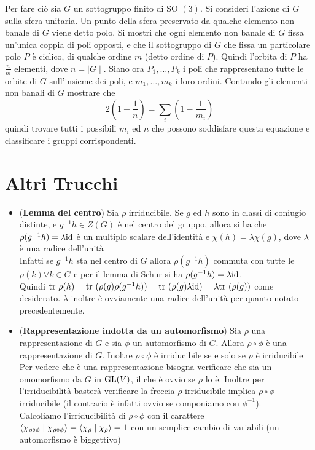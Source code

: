 \documentclass[a4paper,NoNotes,GeneralMath]{stdmdoc}
\newcommand{\SO}{\text{SO }}
\begin{document}
	Per fare ciò sia $G$ un sottogruppo finito di $\SO(3)$. Si consideri l'azione di $G$ sulla sfera unitaria. Un punto della sfera preservato da qualche elemento non banale di $G$ viene detto polo. Si mostri che ogni elemento non banale di $G$ fissa un'unica coppia di poli opposti, e che il sottogruppo di $G$ che fissa un particolare polo $P$ è ciclico, di qualche ordine $m$ (detto ordine di $P$). Quindi l'orbita di $P$ ha $\frac{n}{m}$ elementi, dove $n = \mid G \mid$. Siano ora $P_1, \ldots, P_k$ i poli che rappresentano tutte le orbite di $G$ sull'insieme dei poli, e $m_1, \ldots, m_k$ i loro ordini. Contando gli elementi non banali di $G$ mostrare che $$ 2 \left( 1 - \frac{1}{n} \right) = \sum_i \left( 1 - \frac{1}{m_i} \right) $$ quindi trovare tutti i possibili $m_i$ ed $n$ che possono soddisfare questa equazione e classificare i gruppi corrispondenti.

	\section{Altri Trucchi}
	\begin{itemize}
		\item ({\bf Lemma del centro}) Sia $\rho$ irriducibile. Se $g$ ed $h$ sono in classi di coniugio distinte, e $g^{-1}h \in Z(G)$ è nel centro del gruppo, allora si ha che $\rho(g^{-1}h) = \lambda \mbox{id}$ è un multiplo scalare dell'identità e $\chi(h) = \lambda \chi(g)$, dove $\lambda$ è una radice dell'unità \\
		Infatti se $g^{-1}h$ sta nel centro di $G$ allora $\rho(g^{-1}h)$ commuta con tutte le $\rho(k) \forall k \in G$ e per il lemma di Schur si ha $\rho(g^{-1}h) = \lambda \mbox{id}$. \\
		Quindi $\mbox{tr } \rho(h) = \mbox{tr } ( \rho(g) \rho(g^{-1}h) ) = \mbox{tr } ( \rho(g) \lambda \mbox{id}) = \lambda \mbox{tr }(\rho(g))$ come desiderato.
		$\lambda$ inoltre è ovviamente una radice dell'unità per quanto notato precedentemente.

		\item ({\bf Rappresentazione indotta da un automorfismo}) Sia $\rho$ una rappresentazione di $G$ e sia $\phi$ un automorfismo di $G$. Allora $\rho \circ \phi$ è una rappresentazione di $G$. Inoltre $\rho \circ \phi$ è irriducibile se e solo se $\rho$ è irriducibile \\
		Per vedere che è una rappresentazione bisogna verificare che sia un omomorfismo da $G$ in $\mbox{GL}(V)$, il che è ovvio se $\rho$ lo è. Inoltre per l'irriducibilità basterà verificare la freccia $\rho$ irriducibile implica $\rho \circ \phi$ irriducibile (il contrario è infatti ovvio se componiamo con $\phi^{-1}$). \\
		Calcoliamo l'irriducibilità di $\rho \circ \phi$ con il carattere $\langle \chi_{\rho \circ \phi} \mid \chi_{\rho \circ \phi} \rangle = \langle \chi_\rho \mid \chi_\rho \rangle = 1$ con un semplice cambio di variabili (un automorfismo è biggettivo)

		
	\end{itemize}
\end{document}
